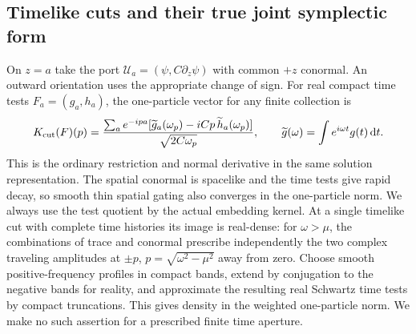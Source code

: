 \documentclass[11pt]{article}
\newcommand{\dd}{\mathrm d}
\begin{document}
\subsection{Timelike cuts and their true joint symplectic form}

On \(z=a\) take the port \(\mathcal U_a=(\psi,C\partial_z\psi)\) with common \(+z\) conormal. An outward orientation uses the appropriate change of sign. For real compact time tests \(F_a=(g_a,h_a)\), the one-particle vector for any finite collection is
\[
 K_{\rm cut}(F)(p)=\frac{\sum_a e^{-ipa}[\widetilde g_a(\omega_p)-iCp\,\widetilde h_a(\omega_p)]}
                       {\sqrt{2C\omega_p}},
 \qquad \widetilde g(\omega)=\int e^{i\omega t}g(t)\,\dd t .
\]
This is the ordinary restriction and normal derivative in the same solution representation. The spatial conormal is spacelike and the time tests give rapid decay, so smooth thin spatial gating also converges in the one-particle norm. We always use the test quotient by the actual embedding kernel. At a single timelike cut with complete time histories its image is real-dense: for \(\omega>\mu\), the combinations of trace and conormal prescribe independently the two complex traveling amplitudes at \(\pm p\), \(p=\sqrt{\omega^2-\mu^2}\) away from zero. Choose smooth positive-frequency profiles in compact bands, extend by conjugation to the negative bands for reality, and approximate the resulting real Schwartz time tests by compact truncations. This gives density in the weighted one-particle norm. We make no such assertion for a prescribed finite time aperture.
\end{document}
